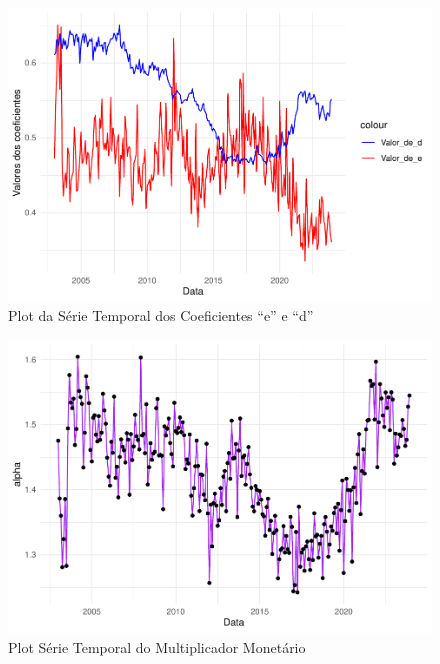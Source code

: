 \documentclass[12pt]{article}
\begin{document}
\begin{figure}
\centering
\includegraphics{multiplicadorpt2_files/figure-latex/unnamed-chunk-8-1.pdf}
\caption{Plot da Série Temporal dos Coeficientes ``e'' e ``d''}
\end{figure}

\begin{figure}
\centering
\includegraphics{multiplicadorpt2_files/figure-latex/unnamed-chunk-9-1.pdf}
\caption{Plot Série Temporal do Multiplicador Monetário}
\end{figure}
\end{document}
